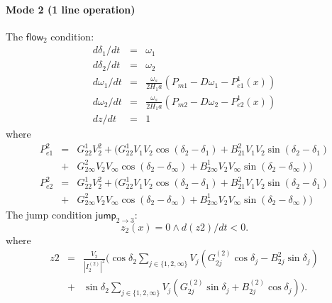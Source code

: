 \documentclass[envcountsect]{llncs}
\newcommand{\flow}{\mathsf{flow}}
\newcommand{\jump}{\mathsf{jump}}
\begin{document}
\paragraph{Mode 2 (1 line operation)}
The $\flow_2$ condition:
\begin{eqnarray*}
d\delta_1/dt &=& \omega_1\\
d\delta_2/dt &=& \omega_2\\
d\omega_1/dt &=& \frac{\omega_s}{2H_1a}(P_{m1} - D\omega_1 - P_{e1}^1(x))\\
d\omega_2/dt &=& \frac{\omega_s}{2H_1a}(P_{m2} - D\omega_2 - P_{e2}^1(x))\\
dz/dt &=& 1
\end{eqnarray*}
where
\begin{eqnarray*}
P_{e1}^2 &=& G_{22}^1V_2^2 + \Big(G_{22}^1 V_1V_2\cos(\delta_2-\delta_1) +
B_{21}^2 V_1V_2\sin(\delta_2-\delta_1)\\
&+& G_{2\infty}^2
V_2V_{\infty}\cos(\delta_2-\delta_{\infty}) + B_{2\infty}^1
V_2V_{\infty}\sin(\delta_2-\delta_{\infty}) \Big)\\
P_{e2}^2 &=& G_{22}^1V_2^2 + \Big(G_{22}^1 V_1V_2\cos(\delta_2-\delta_1) +
B_{21}^2 V_1V_2\sin(\delta_2-\delta_1)\\
&+& G_{2\infty}^2
V_2V_{\infty}\cos(\delta_2-\delta_{\infty}) + B_{2\infty}^1
V_2V_{\infty}\sin(\delta_2-\delta_{\infty}) \Big)
\end{eqnarray*}
The jump condition $\jump_{2 \rightarrow 3}:$
$$z_2(x) = 0 \wedge d(z2)/dt < 0.$$
where
\begin{eqnarray*}
z2 &=& \frac{V_2}{|I_2^(2)|^2}\Big( \cos\delta_2 \sum_{j\in
\{1,2,\infty\}}V_j(G_{2j}^{(2)}\cos\delta_j - B_{2j}^{2}\sin \delta_j)\\
&+&\sin \delta_2 \sum_{j\in \{1,2,\infty\}}V_j(G_{2j}^{(2)}\sin \delta_j +
B_{2j}^{(2)}\cos\delta_j )\Big).
\end{eqnarray*}
\end{document}
